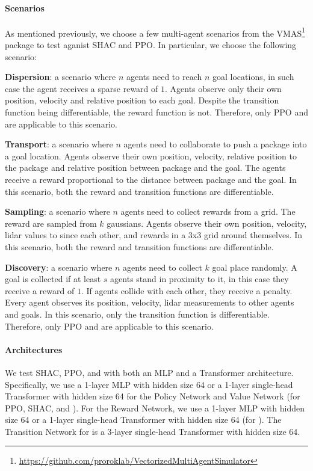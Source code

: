 \paragraph{Scenarios}
As mentioned previously, we choose a few multi-agent scenarios from the VMAS\footnote{\url{https://github.com/proroklab/VectorizedMultiAgentSimulator}} package to test \fname{} aganist SHAC and PPO. In particular, we choose the following scenario:
\begin{compactitem}
    \item \textbf{Dispersion}: a scenario where $n$ agents need to reach $n$ goal locations, in such case the agent receives a sparse reward of $1$. Agents observe only their own position, velocity and relative position to each goal. Despite the transition function being differentiable, the reward function is not. Therefore, only PPO and \fname{} are applicable to this scenario.
    \item \textbf{Transport}: a scenario where $n$ agents need to collaborate to push a package into a goal location. Agents observe their own position, velocity, relative position to the package and relative position between package and the goal. The agents receive a reward proportional to the distance between package and the goal. In this scenario, both the reward and transition functions are differentiable.
    \item \textbf{Sampling}: a scenario where $n$ agents need to collect rewards from a grid. The reward are sampled from $k$ gaussians. Agents observe their own position, velocity, lidar values to since each other, and rewards in a 3x3 grid around themselves.  In this scenario, both the reward and transition functions are differentiable.
    \item \textbf{Discovery}: a scenario where $n$ agents need to collect $k$ goal place randomly. A goal is collected if at least $s$ agents stand in proximity to it, in this case they receive a reward of $1$. If agents collide with each other, they receive a penalty. Every agent observes its position, velocity, lidar measurements to other agents and goals. In this scenario, only the transition function is differentiable. Therefore, only PPO and \fname{} are applicable to this scenario.
\end{compactitem}

\paragraph{Architectures}
We test SHAC, PPO, and \fname{} with both an MLP and a Transformer architecture. Specifically, we use a 1-layer MLP with hidden size 64 or a 1-layer single-head Transformer with hidden size 64 for the Policy Network and Value Network (for PPO, SHAC, and \fname{}). For the Reward Network, we use a 1-layer MLP with hidden size 64 or a 1-layer single-head Transformer with hidden size 64 (for \fname{}). The Transition Network for \fname{} is a 3-layer single-head Transformer with hidden size 64.


